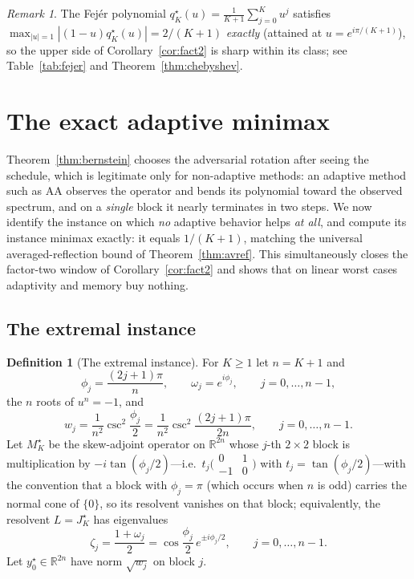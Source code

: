 \documentclass[11pt]{article}
\theoremstyle{definition}
\newtheorem{definition}[theorem]{Definition}
\theoremstyle{remark}
\newtheorem{remark}[theorem]{Remark}
\newcommand{\R}{\mathbb{R}}
\newcommand{\abs}[1]{| #1 |}
\begin{document}
\begin{remark}\label{rem:fejer}
The Fej\'er polynomial $q_K^\star(u)=\frac1{K+1}\sum_{j=0}^K
u^j$ satisfies $\max_{\abs{u}=1}\abs{(1-u)q_K^\star(u)}=2/(K+1)$
\emph{exactly} (attained at $u=e^{i\pi/(K+1)}$), so the upper side of
Corollary~\ref{cor:fact2} is sharp within its class; see
Table~\ref{tab:fejer} and Theorem~\ref{thm:chebyshev}.
\end{remark}

\section{The exact adaptive minimax}\label{sec:adaptive}

Theorem~\ref{thm:bernstein} chooses the adversarial rotation after seeing the
schedule, which is legitimate only for non-adaptive methods: an adaptive
method such as AA observes the operator and bends its polynomial toward the
observed spectrum, and on a \emph{single} block it nearly terminates in two
steps. We now identify the instance on which \emph{no} adaptive behavior
helps \emph{at all}, and compute its instance minimax exactly: it equals
$1/(K+1)$, matching the universal averaged-reflection bound of
Theorem~\ref{thm:avref}. This simultaneously closes the factor-two window
of Corollary~\ref{cor:fact2} and shows that on linear worst cases
adaptivity and memory buy nothing.

\subsection{The extremal instance}

\begin{definition}[The extremal instance]\label{def:extremal}
For $K\ge1$ let $n=K+1$ and
\[
\phi_j=\frac{(2j+1)\pi}{n},\qquad \omega_j=e^{i\phi_j},\qquad
j=0,\dots,n-1,
\]
the $n$ roots of $u^n=-1$, and
\[
w_j=\frac1{n^2}\csc^2\frac{\phi_j}{2}
=\frac1{n^2}\csc^2\frac{(2j+1)\pi}{2n},\qquad j=0,\dots,n-1 .
\]
Let $M_K^\star$ be the skew-adjoint operator on $\R^{2n}$ whose $j$-th
$2\times2$ block is multiplication by $-i\tan(\phi_j/2)$---i.e.\
$t_j\big(\begin{smallmatrix}0&1\\-1&0\end{smallmatrix}\big)$ with
$t_j=\tan(\phi_j/2)$---with the convention that a block with $\phi_j=\pi$
(which occurs when $n$ is odd) carries the normal cone of $\{0\}$, so its
resolvent vanishes on that block; equivalently, the resolvent
$L=J_K^\star$ has eigenvalues
\begin{equation}\label{eq:exteigs}
\zeta_j=\frac{1+\omega_j}{2}
=\cos\frac{\phi_j}2\,e^{\pm i\phi_j/2},\qquad j=0,\dots,n-1 .
\end{equation}
Let $y_0^\star\in\R^{2n}$ have norm $\sqrt{w_j}$ on block $j$.
\end{definition}
\end{document}
